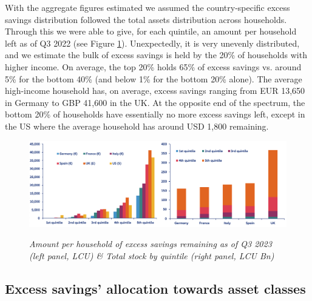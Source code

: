 With the aggregate figures estimated we assumed the country-specific excess savings distribution followed the total assets distribution across households. 
Through this we were able to give, for each quintile, an amount per household left as of Q3 2022 (see Figure \ref{figure:Savings}). 
Unexpectedly, it is very unevenly distributed, and we estimate the bulk of excess savings is held by the 20\% of households with higher income. 
On average, the top 20\% holds 65\% of excess savings vs. around 5\% for the bottom 40\% (and below 1\% for the bottom 20\% alone). 
The average high-income household has, on average, excess savings ranging from EUR 13,650 in Germany to GBP 41,600 in the UK. 
At the opposite end of the spectrum, the bottom 20\% of households have essentially no more excess savings left, except in the US where the average household has around USD 1,800 remaining. 

\begin{figure}[H]
    \centering
    \caption{\textit{Amount per household of excess savings remaining as of Q3 2023 (left panel, LCU) \& Total stock by quintile (right panel, LCU Bn)}}
    \includegraphics[width=1\textwidth]{Core/1.Savings/img/xSavings.png}
    \label{figure:Savings}
\end{figure}

\subsection{Excess savings' allocation towards asset classes}

